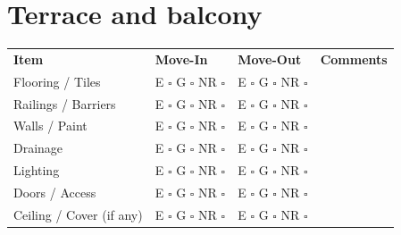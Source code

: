 
\section*{Terrace and balcony}
\label{sec:balcony}

\begin{longtable}{p{6cm} p{3cm} p{3cm} p{4cm}}
\textbf{Item} & \textbf{Move-In} & \textbf{Move-Out} & \textbf{Comments} \\
Flooring / Tiles & E $\square$ G $\square$ NR $\square$ & E $\square$ G $\square$ NR $\square$ & \\
Railings / Barriers & E $\square$ G $\square$ NR $\square$ & E $\square$ G $\square$ NR $\square$ & \\
Walls / Paint & E $\square$ G $\square$ NR $\square$ & E $\square$ G $\square$ NR $\square$ & \\
Drainage & E $\square$ G $\square$ NR $\square$ & E $\square$ G $\square$ NR $\square$ & \\
Lighting & E $\square$ G $\square$ NR $\square$ & E $\square$ G $\square$ NR $\square$ & \\
Doors / Access & E $\square$ G $\square$ NR $\square$ & E $\square$ G $\square$ NR $\square$ & \\
Ceiling / Cover (if any) & E $\square$ G $\square$ NR $\square$ & E $\square$ G $\square$ NR $\square$ & \\
\end{longtable}

